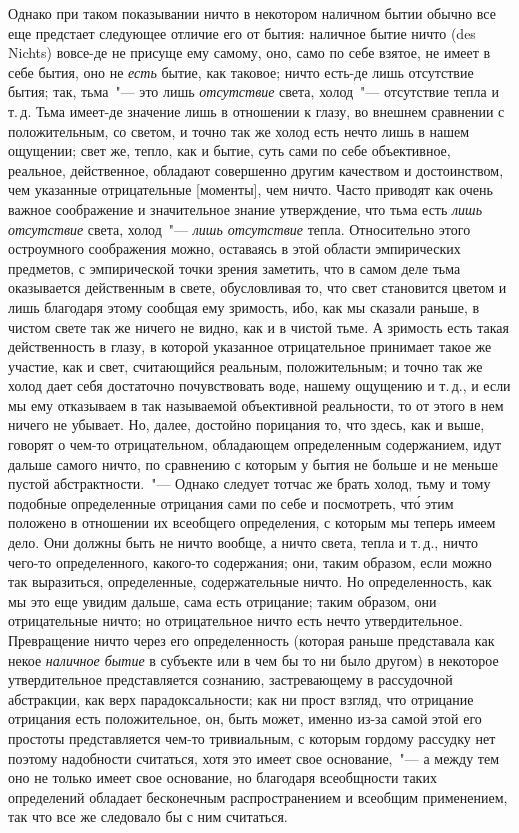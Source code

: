 Однако при таком показывании ничто в некотором
наличном бытии обычно все еще предстает следующее
отличие его от бытия: наличное бытие ничто (des Nichts)
вовсе-де не присуще ему самому, оно, само по себе взятое,
не имеет в себе бытия, оно не \emph{есть} бытие, как таковое;
ничто есть-де лишь отсутствие бытия; так, тьма~"--- это
лишь \emph{отсутствие} света, холод~"--- отсутствие тепла и т.\,д.
Тьма имеет-де значение лишь в отношении к глазу, во
внешнем сравнении с положительным, со светом, и точно
так же холод есть нечто лишь в нашем ощущении; свет
же, тепло, как и бытие, суть сами по себе объективное,
реальное, действенное, обладают совершенно другим качеством
и достоинством, чем указанные отрицательные
[моменты], чем ничто. Часто приводят как очень важное
соображение и значительное знание утверждение, что
тьма есть \emph{лишь отсутствие} света, холод~"--- \emph{лишь отсутствие}
тепла. Относительно этого остроумного соображения
можно, оставаясь в этой области эмпирических предметов,
с эмпирической точки зрения заметить, что в
самом деле тьма оказывается действенным в свете, обусловливая
то, что свет становится цветом\endnotemark{} и лишь благодаря
этому сообщая ему зримость, ибо, как мы сказали
раньше, в чистом свете так же ничего не видно, как и в
чистой тьме. А зримость есть такая действенность в глазу,
в которой указанное отрицательное принимает такое
же участие, как и свет, считающийся реальным, положительным;
и точно так же холод дает себя достаточно почувствовать
воде, нашему ощущению и т.\,д., и если мы
ему отказываем в так называемой объективной реальности,
то от этого в нем ничего не убывает. Но, далее, достойно
порицания то, что здесь, как и выше, говорят о
чем-то отрицательном, обладающем определенным содержанием,
идут дальше самого ничто, по сравнению с которым
у бытия не больше и не меньше пустой абстрактности.~"---
Однако следует тотчас же брать холод, тьму
и тому подобные определенные отрицания сами по себе и
посмотреть, чт\'о этим положено в отношении их всеобщего
определения, с которым мы теперь имеем дело. Они
должны быть не ничто вообще, а ничто света, тепла и т.\,д.,
ничто чего-то определенного, какого-то содержания; они,
таким образом, если можно так выразиться, определенные,
содержательные ничто. Но определенность, как мы
это еще увидим дальше, сама есть отрицание; таким образом,
они отрицательные ничто; но отрицательное ничто
есть нечто утвердительное. Превращение ничто через его
определенность (которая раньше представала как некое
\emph{наличное бытие} в субъекте или в чем бы то ни было другом)
в некоторое утвердительное представляется сознанию,
застревающему в рассудочной абстракции, как верх
парадоксальности; как ни прост взгляд, что отрицание
отрицания есть положительное, он, быть может, именно
из-за самой этой его простоты представляется чем-то
тривиальным, с которым гордому рассудку нет поэтому
надобности считаться, хотя это имеет свое основание,~"---
а между тем оно не только имеет свое основание, но благодаря
всеобщности таких определений обладает бесконечным
распространением и всеобщим применением, так
что все же следовало бы с ним считаться.

